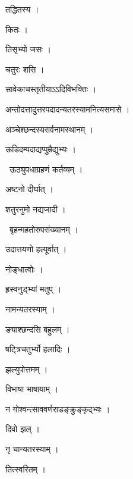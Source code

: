 \documentclass[10pt, openany, oneside]{book}
\begin{document}
\noindent तद्धितस्य ।

\noindent कितः ।

\noindent तिसृभ्यो जसः ।

\noindent चतुरः शसि ।

\noindent सावेकाचस्तृतीयाऽऽदिविभक्तिः ।

\noindent अन्तोदत्तादुत्तरपदादन्यतरस्यामनित्यसमासे ।

\noindent अञ्चेश्छन्दस्यसर्वनामस्थानम् ।

\noindent ऊडिदम्पदाद्यप्पुम्रैद्युभ्यः ।

\par\noindent\hspace{1.5em}{\vps वा॰}~{\qt ऊठ्युपधाग्रहणं कर्तव्यम् ।}

\noindent अष्टनो दीर्घात् ।

\noindent शतुरनुमो नद्यजादी ।

\par\noindent\hspace{1.5em}{\vps वा॰}~{\qt बृहन्महतोरुपसंख्यानम् ।}

\noindent उदात्तयणो हल्पूर्वात् ।

\noindent नोङ्धात्वोः ।

\noindent ह्रस्वनुड्भ्यां मतुप् ।

\noindent नामन्यतरस्याम् ।

\noindent ङ्याश्छन्दसि बहुलम् ।

\noindent षट्त्रिचतुर्भ्यो हलादिः ।

\noindent झल्युपोत्तमम् ।

\noindent विभाषा भाषायाम् ।

\noindent न गोश्वन्त्साववर्णराडङ्क्रुङ्कृद्भ्यः ।

\noindent दिवो झल् ।

\noindent नृ चान्यतरस्याम् ।

\noindent तित्स्वरितम् ।
\end{document}
